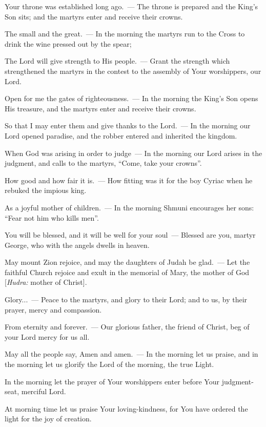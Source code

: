 \documentclass[12pt,twoside,a5paper]{article}
\begin{document}
\begin{halfparskip}
  Your throne was established long ago.~--- The throne is prepared and the King's Son sits; and the martyrs enter and receive their crowns.

  The small and the great.~--- In the morning the martyrs run to the Cross to drink the wine pressed out by the spear;

  The Lord will give strength to His people.~--- Grant the strength which strengthened the martyrs in the contest to the assembly of Your worshippers, our Lord.

  Open for me the gates of righteousness.~--- In the morning the King's Son opens His treasure, and the martyrs enter and receive their crowns.

  So that I may enter them and give thanks to the Lord.~--- In the morning our Lord opened paradise, and the robber entered and inherited the kingdom.

  When God was arising in order to judge~--- In the morning our Lord arises in the judgment, and calls to the martyrs, ``Come, take your crowns''.

  How good and how fair it is.~--- How fitting was it for the boy Cyriac when he rebuked the impious king.

  As a joyful mother of children.~--- In the morning Shmuni encourages her sons: ``Fear not him who kills men''.

  You will be blessed, and it will be well for your soul~--- Blessed are you, martyr George, who with the angels dwells in heaven.

  May mount Zion rejoice, and may the daughters of Judah be glad.~--- Let the faithful Church rejoice and exult in the memorial of Mary, the mother of God [\emph{Hudra:} mother of Christ].

  Glory...~--- Peace to the martyrs, and glory to their Lord; and to us, by their prayer, mercy and compassion.

  From eternity and forever.~--- Our glorious father, the friend of Christ, beg of your Lord mercy for us all.

  May all the people say, Amen and amen.~--- In the morning let us praise, and in the morning let us glorify the Lord of the morning, the true Light.

  In the morning let the prayer of Your worshippers enter before Your judgment-seat, merciful Lord.

  At morning time let us praise Your loving-kindness, for You have ordered the light for the joy of creation.
\end{halfparskip}
\end{document}
